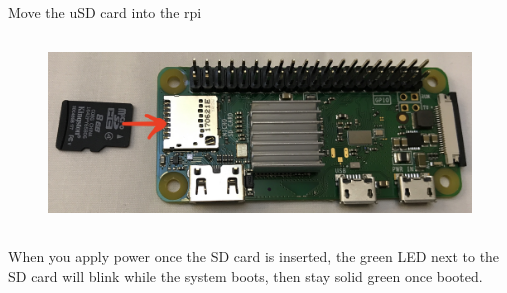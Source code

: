 \begin{frame}
   {Move the uSD card into the rpi}
   \begin{figure}[H]
      \centering
      \includegraphics[height=2in]{IMAGES/rpi0whsd-sd-in}
   \end{figure}

   When you apply power once the SD card is inserted, the green LED next to the
   SD card will blink while the system boots, then stay solid green once booted.
\end{frame}

\cprotect\note{


}

